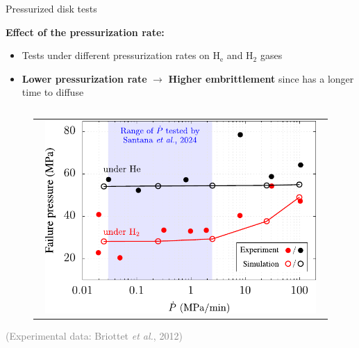\documentclass[9pt]{beamer}
\begin{document}
\begin{frame}{Pressurized disk tests}

    \textbf{Effect of the pressurization rate:}
    \vspace{0.15cm}

    \begin{itemize}
        \item Tests under different pressurization rates on H$_{\textrm{e}}$ and H$_2$ gases
        \vspace{0.15cm}
        \item \textbf{Lower pressurization rate} $\rightarrow$ \textbf{Higher embrittlement} since has a longer time to diffuse
    \end{itemize}

    \begin{columns}

        \begin{column}{0.5\textwidth}

            \begin{figure}
                \begin{tabular}{c}
                    \includegraphics[width=0.95\textwidth]{Images/fig_disk_Pr_edt.pdf}\\
                \end{tabular}
            \end{figure}

            \centering \hspace{0.9cm} \scriptsize \textcolor{gray}{(Experimental data: Briottet \textit{et al.}, 2012)}

        \end{column}
    

\end{columns}
\end{frame}
\end{document}

